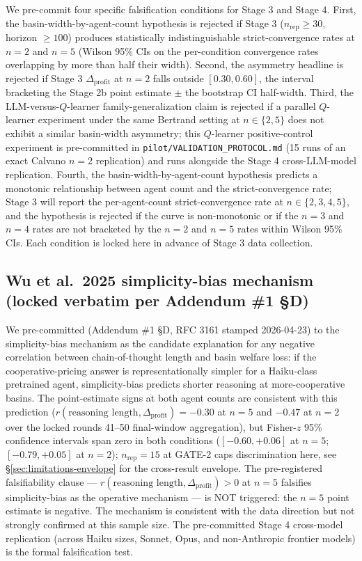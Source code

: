 We pre-commit four specific falsification conditions for Stage 3 and Stage 4. First, the basin-width-by-agent-count hypothesis is rejected if Stage 3 ($n_{\text{rep}} \geq 30$, horizon $\geq 100$) produces statistically indistinguishable strict-convergence rates at $n = 2$ and $n = 5$ (Wilson 95\% CIs on the per-condition convergence rates overlapping by more than half their width). Second, the asymmetry headline is rejected if Stage 3 $\Delta_{\text{profit}}$ at $n = 2$ falls outside $[0.30, 0.60]$, the interval bracketing the Stage 2b point estimate $\pm$ the bootstrap CI half-width. Third, the LLM-versus-$Q$-learner family-generalization claim is rejected if a parallel $Q$-learner experiment under the same Bertrand setting at $n \in \{2, 5\}$ does not exhibit a similar basin-width asymmetry; this $Q$-learner positive-control experiment is pre-committed in \texttt{pilot/VALIDATION\_PROTOCOL.md} (15 runs of an exact Calvano $n=2$ replication) and runs alongside the Stage 4 cross-LLM-model replication. Fourth, the basin-width-by-agent-count hypothesis predicts a monotonic relationship between agent count and the strict-convergence rate; Stage 3 will report the per-agent-count strict-convergence rate at $n \in \{2, 3, 4, 5\}$, and the hypothesis is rejected if the curve is non-monotonic or if the $n = 3$ and $n = 4$ rates are not bracketed by the $n = 2$ and $n = 5$ rates within Wilson 95\% CIs. Each condition is locked here in advance of Stage 3 data collection.

\subsection{Wu et al.\ 2025 simplicity-bias mechanism (locked verbatim per Addendum \#1 \S D)}
\label{sec:discussion-wu2025}

We pre-committed (Addendum \#1 \S D, RFC 3161 stamped 2026-04-23) to the \citet{wu2025whenMoreIsLess} simplicity-bias mechanism as the candidate explanation for any negative correlation between chain-of-thought length and basin welfare loss: if the cooperative-pricing answer is representationally simpler for a Haiku-class pretrained agent, simplicity-bias predicts shorter reasoning at more-cooperative basins. The point-estimate signs at both agent counts are consistent with this prediction ($r(\text{reasoning length}, \Delta_{\text{profit}}) = -0.30$ at $n = 5$ and $-0.47$ at $n = 2$ over the locked rounds 41--50 final-window aggregation), but Fisher-$z$ 95\% confidence intervals span zero in both conditions ($[-0.60, +0.06]$ at $n = 5$; $[-0.79, +0.05]$ at $n = 2$); $n_{\text{rep}} = 15$ at GATE-2 caps discrimination here, see \S\ref{sec:limitations-envelope} for the cross-result envelope. The pre-registered falsifiability clause --- $r(\text{reasoning length}, \Delta_{\text{profit}}) > 0$ at $n = 5$ falsifies simplicity-bias as the operative mechanism --- is NOT triggered: the $n = 5$ point estimate is negative. The mechanism is consistent with the data direction but not strongly confirmed at this sample size. The pre-committed Stage 4 cross-model replication (across Haiku sizes, Sonnet, Opus, and non-Anthropic frontier models) is the formal falsification test.
